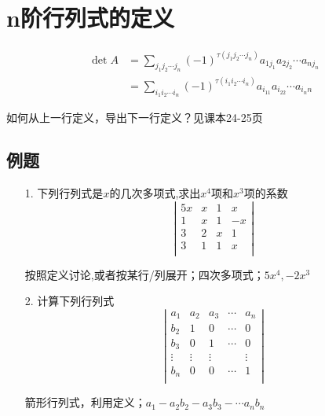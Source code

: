 \section{n阶行列式的定义}
\begin{equation}
\nonumber
\begin{aligned}
\det{A} &= \sum_{j_1 j_2\cdots j_n} (-1)^{\tau(j_1 j_2\cdots j_n)}a_{1j_1}a_{2j_2}\cdots a_{nj_n}\\
        &= \sum_{i_1 i_2\cdots i_n} (-1)^{\tau(i_1 i_2\cdots i_n)}a_{i_11}a_{i_22}\cdots a_{i_nn}
\end{aligned}
\end{equation}

\begin{remark}
	如何从上一行定义，导出下一行定义？见课本\cite{book1}24-25页
\end{remark}

\subsection*{例题}
\begin{itemize}
    \item[1.] 下列行列式是$x$的几次多项式,求出$x^4$项和$x^3$项的系数
    \begin{equation}
    \nonumber
    \left|
        \begin{array}{rrrr}
        5x &x &1 &x\\
        1  &x &1 &-x\\
        3  &2 &x &1\\
        3  &1 &1 &x\\
        \end{array}
    \right|
    \end{equation} 
	\begin{solution}
		按照定义讨论,或者按某行/列展开；四次多项式；$5x^4, -2x^3$
	\end{solution}
    \vspace{2cm}

    \item[2.] 计算下列行列式
    \begin{equation}
    \nonumber
    \left|
        \begin{array}{rrrrr}
        a_1 &a_2 &a_3 &\cdots &a_n\\
        b_2 &1   &0   &\cdots &0\\
        b_3 &0   &1   &\cdots &0\\
        \vdots &\vdots   &\vdots   & &\vdots\\
        b_n &0   &0   &\cdots &1\\
        \end{array}
    \right|
    \end{equation}
	\begin{solution}
		箭形行列式，利用定义；$a_1 - a_2b_2 - a_3b_3 - \cdots a_n b_n$
	\end{solution}
    \vspace{2cm}
\end{itemize}

